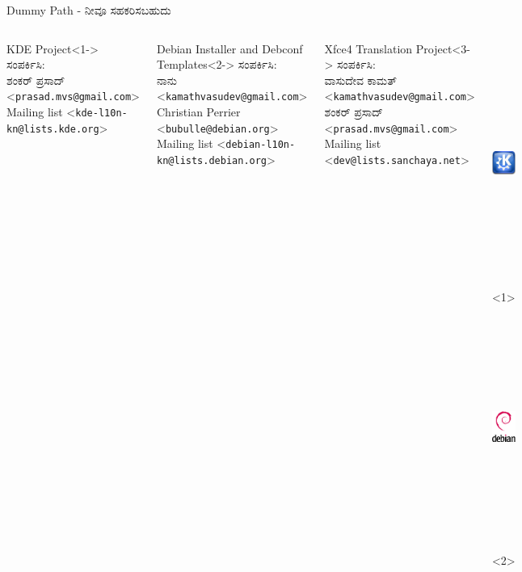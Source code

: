 \documentclass[slidestop,compress,brown]{beamer}
\newcommand\en[1]{{\english #1}}
\begin{document}
\begin{frame}{\en{Dummy Path -} ನೀವೂ ಸಹಕರಿಸಬಹುದು}
  \begin{columns}[c]
    \begin{block}{\en{KDE Project}}<1->
      \tiny{ಸಂಪರ್ಕಿಸಿ:\\ ಶಂಕರ್ ಪ್ರಸಾದ್ \en{<\texttt{prasad.mvs@gmail.com}>}\\
        \en{Mailing list <\texttt{kde-l10n-kn@lists.kde.org}>}}
    \end{block}
    \begin{block}{\en{Debian Installer and Debconf Templates}}<2->
      \tiny{ಸಂಪರ್ಕಿಸಿ:\\ನಾನು \en{<\texttt{kamathvasudev@gmail.com}>}\\
        \en{Christian Perrier <\texttt{bubulle@debian.org}\en{>}}\\
        \en{Mailing list <\texttt{debian-l10n-kn@lists.debian.org}>}}
    \end{block}
    \begin{block}{\en{Xfce4 Translation Project}}<3->
      \tiny{ಸಂಪರ್ಕಿಸಿ:\\
        ವಾಸುದೇವ ಕಾಮತ್ \en{<\texttt{kamathvasudev@gmail.com}>}\\
        ಶಂಕರ್ ಪ್ರಸಾದ್ \en{<\texttt{prasad.mvs@gmail.com}>}\\
        \en{Mailing list <\texttt{dev@lists.sanchaya.net}>}}
    \end{block}
    \includegraphics[width=4cm,height=8cm,keepaspectratio]{kde}<1>
    \includegraphics[width=4cm,height=8cm,keepaspectratio]{debian}<2>

\end{columns}
\end{frame}
\end{document}
